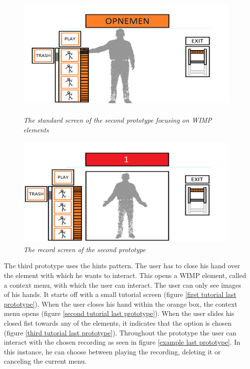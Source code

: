 \begin{figure}[H]
	\begin{center}
		\includegraphics[width=11.5cm, height=6.5cm]{figures/prototype_5_3_standard.png}
		\caption{\emph{The standard screen of the second prototype focusing on WIMP elements}}
		\label{standard third prototype}
	\end{center}
\end{figure}

\begin{figure}[H]
	\begin{center}
		\includegraphics[width=11.2cm, height=5.5cm]{figures/prototype_6_3_record.png}
		\caption{\emph{The record screen of the second prototype}}
		\label{record third prototype}
	\end{center}
\end{figure}

The third prototype uses the hints pattern. The user has to close his hand over the element with which he wants to interact. This opens a WIMP element, called a context menu, with which the user can interact. The user can only see images of his hands. It starts off with a small tutorial screen (figure \ref{first tutorial last prototype}). When the user closes his hand within the orange box, the context menu opens (figure \ref{second tutorial last prototype}). When the user slides his closed fist towards any of the elements, it indicates that the option is chosen (figure \ref{third tutorial last prototype}). Throughout the prototype the user can interact with the chosen recording as seen in figure \ref{example last prototype}. In this instance, he can choose between playing the recording, deleting it or canceling the current menu.

